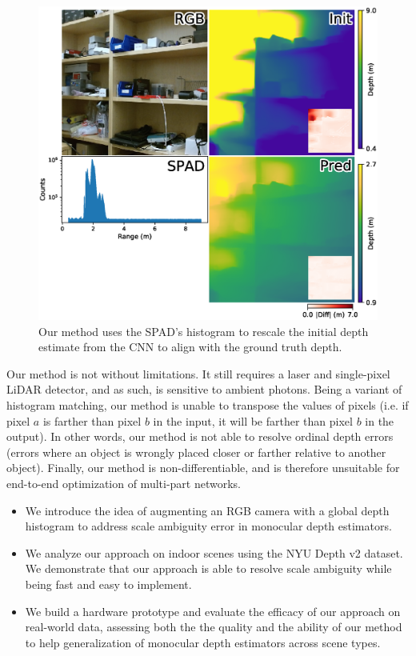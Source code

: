\begin{figure}
  \includegraphics[width=\linewidth]{sections/figures/captured/midas/8_30_small_lab_scene/teaser.eps}
  \caption{Our method uses the SPAD's histogram to rescale the initial depth
    estimate from the CNN to align with the ground truth depth.}
  \label{fig:teaser}
\end{figure}
Our method is not without limitations. It still requires a laser and
single-pixel LiDAR detector, and as such, is sensitive to ambient photons. Being 
a variant of histogram matching, our method is unable to transpose the
values of pixels (i.e. if pixel $a$ is farther
than pixel $b$ in the input, it will be farther than pixel $b$ in the output).
In other words, our method is not able to resolve ordinal depth errors
(errors where an object is wrongly placed closer or farther
relative to another object). Finally, our method is non-differentiable, and is
therefore unsuitable for end-to-end optimization of multi-part networks.

\begin{itemize}
	\item We introduce the idea of augmenting an RGB camera with a global depth 
    histogram to address scale ambiguity error in monocular depth estimators.	
  \item We analyze our approach on indoor scenes using the NYU Depth v2 dataset.
    We demonstrate that our approach is able to resolve scale ambiguity while
    being fast and easy to implement.
	\item We build a hardware prototype and evaluate the efficacy of our
    approach on real-world data, assessing both the the quality and the ability of our method
    to help generalization of monocular depth estimators across scene types. 
\end{itemize}


